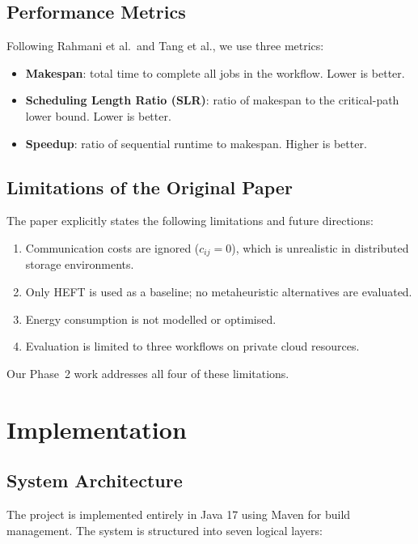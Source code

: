 \documentclass[12pt,a4paper]{article}
\begin{document}
\subsection{Performance Metrics}
Following Rahmani et al.\ and Tang et al., we use three metrics:
\begin{itemize}[leftmargin=1.5cm]
    \item \textbf{Makespan}: total time to complete all jobs in the workflow. Lower is better.
    \item \textbf{Scheduling Length Ratio (SLR)}: ratio of makespan to the critical-path lower bound. Lower is better.
    \item \textbf{Speedup}: ratio of sequential runtime to makespan. Higher is better.
\end{itemize}

\subsection{Limitations of the Original Paper}
The paper explicitly states the following limitations and future directions:
\begin{enumerate}[leftmargin=1.5cm]
    \item Communication costs are ignored ($c_{ij} = 0$), which is unrealistic in distributed storage environments.
    \item Only HEFT is used as a baseline; no metaheuristic alternatives are evaluated.
    \item Energy consumption is not modelled or optimised.
    \item Evaluation is limited to three workflows on private cloud resources.
\end{enumerate}
Our Phase~2 work addresses all four of these limitations.

\section{Implementation}
\label{sec:implementation}

\subsection{System Architecture}
The project is implemented entirely in Java 17 using Maven for build management. The system is structured into seven logical layers:
\end{document}
